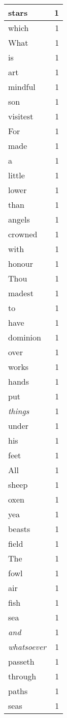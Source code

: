 \begin{center}
\begin{longtable}{l|r}
stars & 1 \\ \hline
which & 1 \\ \hline
What & 1 \\ \hline
is & 1 \\ \hline
art & 1 \\ \hline
mindful & 1 \\ \hline
son & 1 \\ \hline
visitest & 1 \\ \hline
For & 1 \\ \hline
made & 1 \\ \hline
a & 1 \\ \hline
little & 1 \\ \hline
lower & 1 \\ \hline
than & 1 \\ \hline
angels & 1 \\ \hline
crowned & 1 \\ \hline
with & 1 \\ \hline
honour & 1 \\ \hline
Thou & 1 \\ \hline
madest & 1 \\ \hline
to & 1 \\ \hline
have & 1 \\ \hline
dominion & 1 \\ \hline
over & 1 \\ \hline
works & 1 \\ \hline
hands & 1 \\ \hline
put & 1 \\ \hline
\emph{things} & 1 \\ \hline
under & 1 \\ \hline
his & 1 \\ \hline
feet & 1 \\ \hline
All & 1 \\ \hline
sheep & 1 \\ \hline
oxen & 1 \\ \hline
yea & 1 \\ \hline
beasts & 1 \\ \hline
field & 1 \\ \hline
The & 1 \\ \hline
fowl & 1 \\ \hline
air & 1 \\ \hline
fish & 1 \\ \hline
sea & 1 \\ \hline
\emph{and} & 1 \\ \hline
\emph{whatsoever} & 1 \\ \hline
passeth & 1 \\ \hline
through & 1 \\ \hline
paths & 1 \\ \hline
seas & 1 \\ \hline
\end{longtable}
\end{center}



